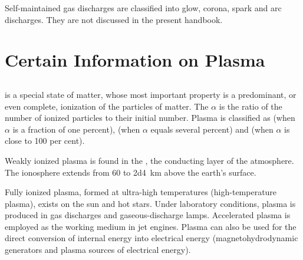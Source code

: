 Self-maintained gas discharges are classified into glow, corona, spark and arc discharges. They are not discussed in the present handbook.

\section{Certain Information on Plasma}
\label{sec-22.6}

\subsection{}\label{22.6.1}  is a special state of matter, whose most important property is a predominant, or even complete, ionization of the particles of matter. The  $\alpha$ is the ratio of the number of ionized particles to their initial number. Plasma is classified as  (when $\alpha$ is a fraction of one percent),  (when $\alpha$ equals several percent) and  (when $\alpha$ is close to 100 per cent).

Weakly ionized plasma is found in the , the conducting layer of the atmosphere. The ionosphere extends from 60 to \SI{2d4}{\kilo\meter} above the earth's surface.

Fully ionized plasma, formed at ultra-high temperatures (high-temperature plasma), exists on the sun and hot stars. Under laboratory conditions, plasma is produced in gas discharges  and gaseous-discharge lamps. Accelerated plasma is employed as the working medium  in jet engines. Plasma can also be used for the direct conversion of internal energy into electrical energy (magnetohydrodynamic generators and plasma sources of electrical energy).


